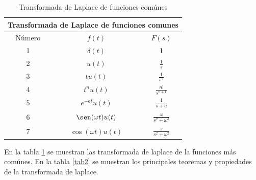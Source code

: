 \documentclass[12pt]{book}
\theoremstyle{definition}
\theoremstyle{remark}
\theoremstyle{plain}
\begin{document}
\begin{table}[!hbt]
\begin{center}
\begin{tabular}{|c|c|c|}
\hline
\multicolumn{3}{|c|}{Transformada de Laplace de funciones comunes}\\
\hline
Número & $f(t)$ & $F(s)$ \\
\hline
\hline
1 & $ \delta (t) $ & 1\\
\hline
2 & $u(t)$ & $\frac{1}{s}$\\
\hline
3 & $t u(t) $ & $\frac{1}{s^2}$ \\
\hline
4 & $t^n u(t)$& $\frac{n !}{s^{n+1}}$  \\
\hline
5 & $e^{-a t} u(t)$ & $\frac{1}{s+a}$ \\
\hline
6 & $\sen (\omega t) u(t) $ & $\frac{\omega}{s^2+\omega ^2}$ \\
\hline
7 & $\cos (\omega t) u(t)$ & $\frac{s}{s^2+\omega ^2} $ \\
\hline
\end{tabular}
\end{center}
\caption[tab1]{Transformada de Laplace de funciones comúnes}
\label{tab1}
\end{table}

En la  tabla \ref{tab1}  se muestran las transformada de laplace de la funciones más comúnes. En la tabla \ref{tab2} se muestran los principales teoremas y propiedades de la transformada de laplace.
\end{document}
